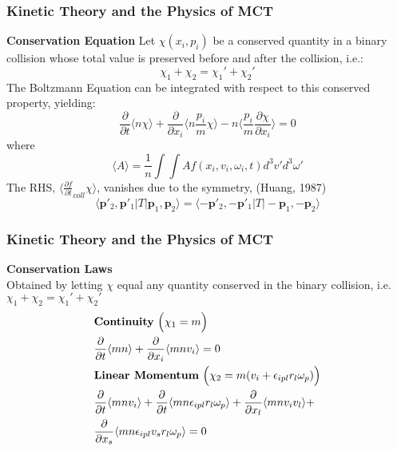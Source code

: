 \documentclass{beamer}
\begin{document}
\begin{frame}
 \frametitle{Kinetic Theory and the Physics of MCT}
 \textbf{\large Conservation Equation}
 Let $\chi(x_i, p_i)$ be a conserved quantity in a binary collision whose total 
value is preserved before and after the collision, i.e.:
\begin{equation*}
 \chi_1 + \chi_2 = \chi_1' + \chi_2'
\end{equation*}
The Boltzmann Equation can be integrated with respect to this conserved 
property, yielding:
\begin{equation*}
  \frac{\partial }{\partial t} \langle n\chi
\rangle + \frac{\partial}{\partial x_{i}} \langle n
\frac{p_{i}}{m}\chi
\rangle - n \langle \frac{p_{i}}{m}\frac{\partial \chi}{\partial x_{i}}
\rangle = 0
\end{equation*}
where
\begin{equation*}
  \langle A \rangle = \frac{1}{n} \int \int A f(x_{i}, v_{i}, \omega_{i}, t) 
d^3v' d^3\omega'
\end{equation*}
The RHS, $\langle \frac{\partial f}{\partial t}_{coll} \chi \rangle $, vanishes 
due to the symmetry, (Huang, 1987) $$\langle \textbf{p}'_2, \textbf{p}'_1 
|T|\textbf{p}_1, \textbf{p}_2\rangle = \langle -\textbf{p}'_2, 
-\textbf{p}'_1 |T| -\textbf{p}_1,-\textbf{p}_2\rangle$$
\end{frame}

\begin{frame}
 \frametitle{Kinetic Theory and the Physics of MCT}
 \textbf{\large Conservation Laws}\\
 \vspace{2mm}
 Obtained by letting $\chi$ equal any quantity conserved in the binary 
collision, i.e. $\chi_1 + \chi_2 = \chi_1' + \chi_2'$ \\
 \begin{align*}
 \centering
 \small
\label{firstordercont}
&\textbf{Continuity} \ \Big(\chi_1 = m\Big) \nonumber \\
&\frac{\partial }{\partial t}\langle mn
\rangle + \frac{\partial }{\partial x_i}\langle mnv_i
\rangle = 0 \\
\label{firstordermoment}
&\textbf{Linear Momentum} \ \Big(\chi_2 = m(v_i + 
\epsilon_{ipl}r_l\omega_p)\Big) \nonumber \\
&\frac{\partial}{\partial t}\langle mn v_i
\rangle + \frac{\partial }{\partial t}\langle mn 
\epsilon_{ipl}r_{l}\omega_{p}
\rangle + \frac{\partial}{\partial x_{l}}\langle mn v_iv_l
\rangle + 
\\ &\frac{\partial }{\partial x_s}\langle mn\epsilon_{ipl} v_s r_{l}\omega_{p}
\rangle = 0 
\nonumber \\
\end{align*}
\end{frame}
\end{document}
